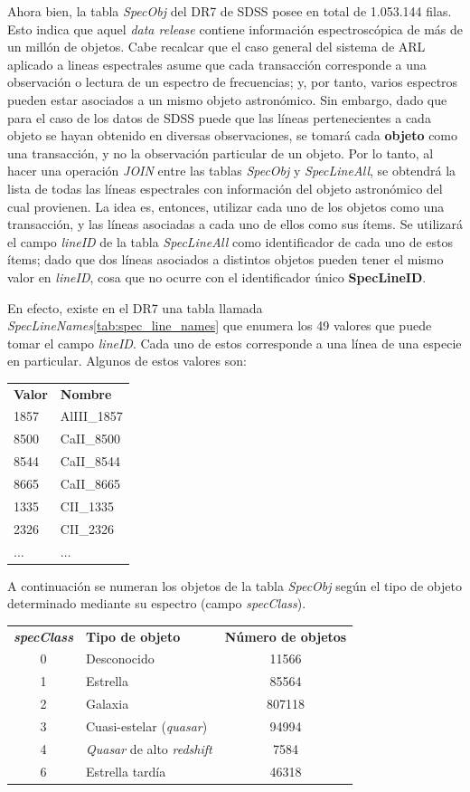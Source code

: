Ahora bien, la tabla \textit{SpecObj} del DR7 de SDSS posee en total de 1.053.144 filas. Esto indica que aquel \textit{data release} contiene información espectroscópica de más de un millón de objetos. Cabe recalcar que el caso general del sistema de ARL aplicado a lineas espectrales asume que cada transacción corresponde a una observación o lectura de un espectro de frecuencias; y, por tanto, varios espectros pueden estar asociados a un mismo objeto astronómico. Sin embargo, dado que para el caso de los datos de SDSS puede que las líneas pertenecientes a cada objeto se hayan obtenido en diversas observaciones, se tomará cada \textbf{objeto} como una transacción, y no la observación particular de un objeto. Por lo tanto, al hacer una operación \textit{JOIN} entre las tablas \textit{SpecObj} y \textit{SpecLineAll}, se obtendrá la lista de todas las líneas espectrales con información del objeto astronómico del cual provienen. La idea es, entonces, utilizar cada uno de los objetos como una transacción, y las líneas asociadas a cada uno de ellos como sus ítems. Se utilizará el campo \textit{lineID} de la tabla \textit{SpecLineAll} como identificador de cada uno de estos ítems; dado que dos líneas asociados a distintos objetos pueden tener el mismo valor en \textit{lineID}, cosa que no ocurre con el identificador único \textbf{SpecLineID}. 

En efecto, existe en el DR7 una tabla llamada \textit{SpecLineNames}\ref{tab:spec_line_names} que enumera los 49 valores que puede tomar el campo \textit{lineID}. Cada uno de estos corresponde a una línea de una especie en particular. Algunos de estos valores son:

\begin{tabular}{l l}
\textbf{Valor} & \textbf{Nombre} \\
1857 & AlIII\_1857 \\
8500 & CaII\_8500 \\
8544 & CaII\_8544 \\
8665 & CaII\_8665 \\
1335 & CII\_1335 \\
2326 & CII\_2326 \\
$\ldots$ & $\ldots$ \\
\end{tabular}

A continuación se numeran los objetos de la tabla \textit{SpecObj} según el tipo de objeto determinado mediante su espectro (campo \textit{specClass}).

\begin{tabular}{c l c}
\textbf{\textit{specClass}} & \textbf{Tipo de objeto} & \textbf{Número de objetos}\\
0 & Desconocido & 11566 \\
1 & Estrella & 85564 \\
2 & Galaxia & 807118 \\
3 & Cuasi-estelar (\textit{quasar}) & 94994 \\
4 & \textit{Quasar} de alto \textit{redshift} & 7584 \\
6 & Estrella tardía & 46318 \\
\end{tabular}

